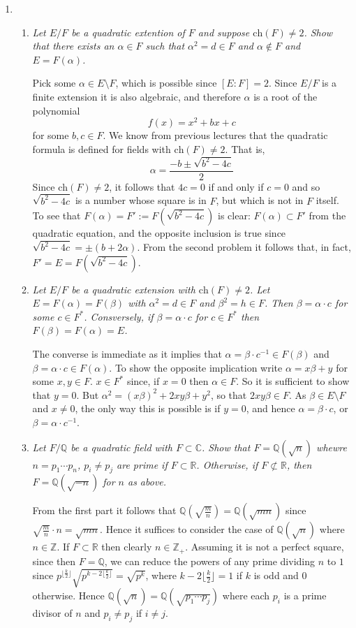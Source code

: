 \documentclass[10pt]{article}
\newcommand{\ch}{\text{ch}}
\newcommand{\Z}{\mathbb{Z}}
\newcommand{\Q}{\mathbb{Q}}
\newcommand{\R}{\mathbb{R}}
\newcommand{\C}{\mathbb{C}}
\begin{document}
\begin{enumerate}
\item 
\begin{enumerate}
\item \emph{Let $E/F$ be a quadratic extention of $F$ and suppose $\ch(F) \neq 2$.  Show that there exists an $\alpha \in F$ such that $\alpha^2 = d \in F$ and $\alpha \notin F$ and $E = F(\alpha)$.}

Pick some $\alpha \in E \setminus F$, which is possible since $[E:F] = 2$.  Since $E/F$ is a finite extension it is also algebraic, and therefore $\alpha$ is a root of the polynomial $$f(x) = x^2 + bx + c$$ for some $b,c \in F$.  We know from previous lectures that the quadratic formula is defined for fields with $\ch(F) \neq 2$.  That is, $$\alpha = \frac{-b \pm \sqrt{b^2 - 4c}}{2}$$  Since $\ch(F) \neq 2$, it follows that $4c = 0$ if and only if $c = 0$ and so $\sqrt{b^2-4c}$ is a number whose square is in $F$, but which is not in $F$ itself.  To see that $F(\alpha) = F' := F(\sqrt{b^2 - 4c})$ is clear: $F(\alpha) \subset F'$ from the quadratic equation, and the opposite inclusion is true since $\sqrt{b^2 - 4c} = \pm(b + 2\alpha)$.  From the second problem it follows that, in fact, $F' = E = F(\sqrt{b^2 - 4c})$.

\item \emph{Let $E/F$ be a quadratic extension with $\ch(F) \neq 2$.  Let $E = F(\alpha) = F(\beta)$ with $\alpha^2 = d \in F$ and $\beta^2 = h \in F$.  Then $\beta = \alpha \cdot c$ for some $c \in F^\ast$.  Consversely, if $\beta = \alpha \cdot c$ for $c \in F^\ast$ then $F(\beta) = F(\alpha) = E$.}

The converse is immediate as it implies that $\alpha = \beta \cdot c^{-1} \in F(\beta)$ and $\beta = \alpha \cdot c \in F(\alpha)$.  To show the opposite implication write $\alpha = x\beta  + y$ for some $x,y \in F$.  $x \in F^\ast$ since, if $x = 0$ then $\alpha \in F$.  So it is sufficient to show that $y = 0$.  But $\alpha^2 = (x\beta)^2 + 2xy\beta + y^2$, so that $2xy\beta \in F$.  As $\beta \in E \setminus F$ and $x \neq 0$, the only way this is possible is if $y = 0$, and hence $\alpha = \beta \cdot c$, or $\beta = \alpha \cdot c^{-1}$.

\item \emph{Let $F/\Q$ be a quadratic field with $F \subset \C$.  Show that $F = \Q(\sqrt{n})$ whewre $n = p_1\cdots p_n$, $p_i \neq p_j$ are prime if $F \subset \R$.  Otherwise, if $F \not\subset \R$, then $F = \Q(\sqrt{-n})$ for $n$ as above.}

From the first part it follows that $\Q(\sqrt{\frac{m}{n}}) = \Q(\sqrt{mn})$ since $\sqrt{\frac{m}{n}} \cdot n = \sqrt{mn}$.  Hence it suffices to consider the case of $\Q(\sqrt{n})$ where $n \in \Z$.  If $F \subset \R$ then clearly $n \in \Z_+$.  Assuming it is not a perfect square, since then $F = \Q$, we can reduce the powers of any prime dividing $n$ to $1$ since $p^{\lfloor \frac{k}{2} \rfloor} \sqrt{p^{k - 2\lfloor \frac{k}{2} \rfloor}} = \sqrt{p^k}$, where $k - 2\lfloor \frac{k}{2} \rfloor = 1$ if $k$ is odd and $0$ otherwise.  Hence $\Q(\sqrt{n}) = \Q(\sqrt{p_1 \cdots p_j})$ where each $p_i$ is a prime divisor of $n$ and $p_i \neq p_j$ if $i \neq j$.
\end{enumerate}


\end{enumerate}
\end{document}
